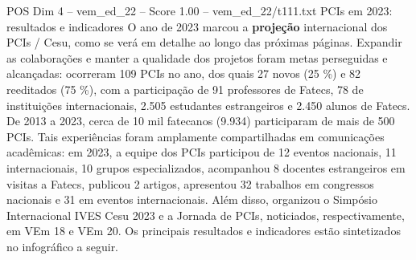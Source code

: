 \begin{textsample}{POS Dim 4 – vem\_ed\_22 – Score 1.00 – vem\_ed\_22/t111.txt}  \label{ex:f4_pos_155}
PCIs em 2023: resultados e indicadores O ano de 2023 marcou a \textbf{projeção} internacional dos PCIs / Cesu, como se verá em detalhe ao longo das próximas páginas.
Expandir as colaborações e manter a qualidade dos projetos foram metas perseguidas e alcançadas: ocorreram 109 PCIs no ano, dos quais 27 novos (25 \%) e 82 reeditados (75 \%), com a participação de 91 professores de Fatecs, 78 de instituições internacionais, 2.505 estudantes estrangeiros e 2.450 alunos de Fatecs.
De 2013 a 2023, cerca de 10 mil fatecanos (9.934) participaram de mais de 500 PCIs.
Tais experiências foram amplamente compartilhadas em comunicações acadêmicas: em 2023, a equipe dos PCIs participou de 12 eventos nacionais, 11 internacionais, 10 grupos especializados, acompanhou 8 docentes estrangeiros em visitas a Fatecs, publicou 2 artigos, apresentou 32 trabalhos em congressos nacionais e 31 em eventos internacionais.
Além disso, organizou o Simpósio Internacional IVES Cesu 2023 e a Jornada de PCIs, noticiados, respectivamente, em VEm 18 e VEm 20.
Os principais resultados e indicadores estão sintetizados no infográfico a seguir.

\end{textsample}
